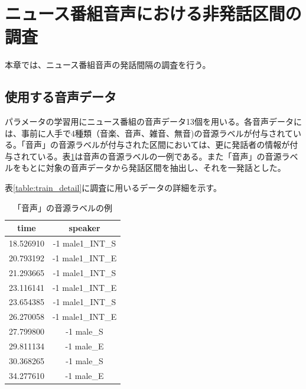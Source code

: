 \section{ニュース番組音声における非発話区間の調査}
本章では、ニュース番組音声の発話間隔の調査を行う。

\subsection{使用する音声データ}
パラメータの学習用にニュース番組の音声データ13個を用いる。各音声データには、事前に人手で4種類（音楽、音声、雑音、無音)の音源ラベルが付与されている。「音声」の音源ラベルが付与された区間においては、更に発話者の情報が付与されている。表\ref{fig:example_label}は音声の音源ラベルの一例である。また「音声」の音源ラベルをもとに対象の音声データから発話区間を抽出し、それを一発話とした。\par
表\ref{table:train_detail}に調査に用いるデータの詳細を示す。\vspace{0.2in}


\begin{table}[H]
\begin{center}
\caption{「音声」の音源ラベルの例 \label{fig:example_label}}
\begin{tabular}{|c|c|}
\hline
time      & speaker          \\ \hline
18.526910 & -1 male1\_INT\_S \\ \hline
20.793192 & -1 male1\_INT\_E \\ \hline
21.293665 & -1 male1\_INT\_S \\ \hline
23.116141 & -1 male1\_INT\_E \\ \hline
23.654385 & -1 male1\_INT\_S \\ \hline
26.270058 & -1 male1\_INT\_E \\ \hline
27.799800 & -1 male\_S       \\ \hline
29.811134 & -1 male\_E       \\ \hline
30.368265 & -1 male\_S       \\ \hline
34.277610 & -1 male\_E       \\ \hline
\end{tabular}
\end{center}
\end{table}

